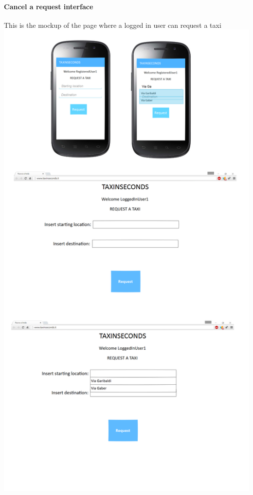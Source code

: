 \documentclass{article}
\begin{document}
\paragraph{Cancel a request interface}%
This is the mockup of the page where a logged in user can request a taxi
\includegraphics{Request a taxi interface}
\clearpage
\end{document}
